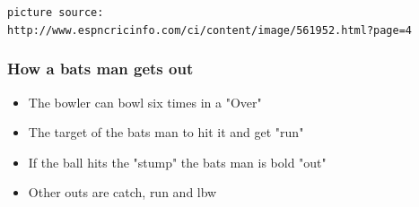\documentclass{beamer}
\begin{document}
\begin{frame}
\begin{columns}
		\begin{column}{0.5\textwidth}
			 \begin{center}  \end{center}
		\end{column}
		
	\end{columns} 
	
\texttt {\tiny picture source: http://www.espncricinfo.com/ci/content/image/561952.html?page=4}	
	
\end{frame}


\begin{frame}
  \frametitle{How a bats man gets out}
  
		  \begin{itemize}
			  \item The bowler can bowl six times in a "Over"
			  \item The target of the bats man to hit it and get "run"
			  \item If the ball hits the "stump" the bats man is bold "out"
			  \item Other outs are catch, run and lbw
		  \end{itemize}		
\end{frame}
\end{document}
